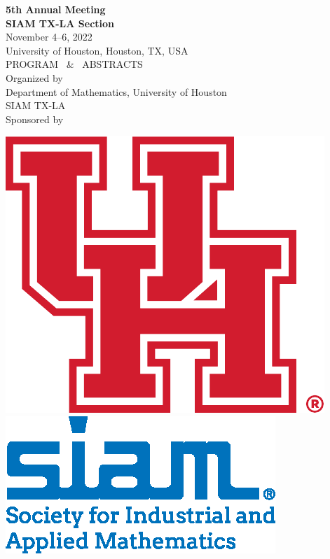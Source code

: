 \thispagestyle{empty}
\vspace*{4ex}

{\center
{\LARGE \bf 5th Annual Meeting}\\  [3mm]
{\Huge \bf SIAM TX-LA Section} \\ [8mm]

{\Large November 4--6, 2022} \\[3mm]
{\Large University of Houston, Houston, TX, USA} \\[36mm]

{\LARGE PROGRAM \ \& \ ABSTRACTS}  \\ [32mm]


{\large Organized by} \\ [3mm]
{\Large Department of  Mathematics, University of Houston\\
\vspace{5pt} SIAM TX-LA} \\ [16mm]

\vfill
{\large Sponsored by}\\[3mm]
\begin{center}
\includegraphics[totalheight = 3cm]{figures/uh.pdf}
\qquad\includegraphics[totalheight = 3cm]{figures/siam_logo_blue_cobranded_stack.eps}
\end{center}
}

